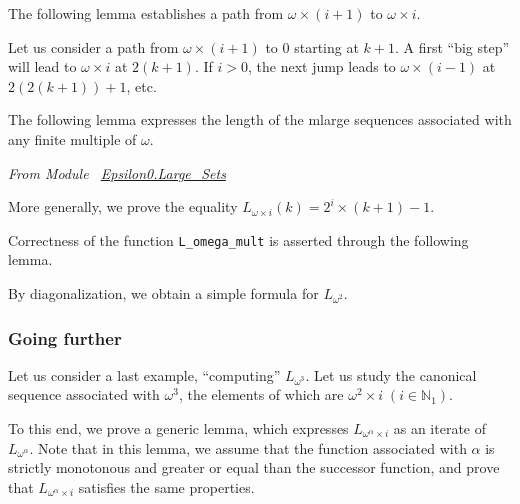 The following lemma establishes a path from $\omega\times ( i+1)$ to
$\omega \times i$.



Let us consider a path from  $\omega\times(i+1)$ to $0$ starting at $k+1$.
A first ``big step'' will lead to $\omega\times i$ at $2(k+1)$. If $i>0$, the
next jump leads to $\omega\times(i-1)$ at $2(2(k+1))+1$, etc.

The following lemma expresses the length of the mlarge sequences associated with any finite multiple of $\omega$.




\emph{From Module~ \href{../theories/html/hydras.Epsilon0.Large_Sets.html\#L_omega_mult}{Epsilon0.Large\_Sets}}



More generally, we prove the equality $L_{\omega\times i}(k)=2^i\times(k+1)-1$.




Correctness of the function \texttt{L\_omega\_mult} is asserted through the following lemma.




By diagonalization, we obtain a simple formula for $L_{\omega^2}$.














\subsubsection{Going further}
Let us consider a last example, ``computing'' $L_{\omega^3}$.
Let us study the canonical sequence associated with $\omega^3$, the elements of which are 
$\omega^2\times i\;(i\in\mathbb{N}_1)$.

To this end, we prove a generic lemma, which expresses $L_{\omega^\alpha\times i}$ as an iterate of $L_{\omega^\alpha}$. Note that in this lemma, we assume that the function associated with $\alpha$ is strictly monotonous and
greater or equal than the successor function, and prove that $L_{\omega^\alpha\times i}$ satisfies  the same properties.


